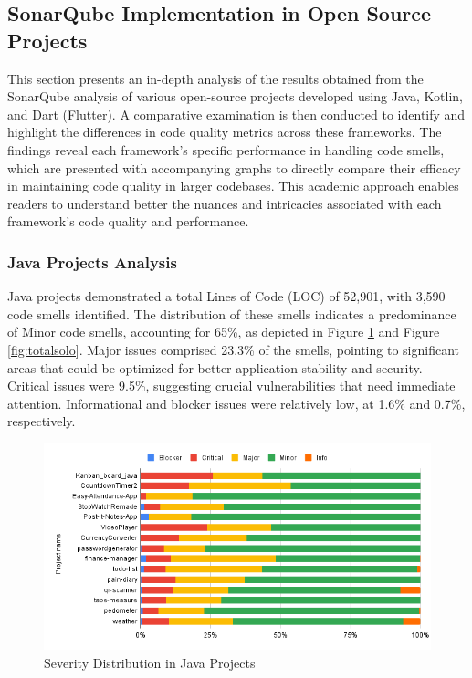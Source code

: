 \subsection{SonarQube Implementation in Open Source Projects}
This section presents an in-depth analysis of the results obtained from the SonarQube analysis of various open-source projects developed using Java, Kotlin, and Dart (Flutter). A comparative examination is then conducted to identify and highlight the differences in code quality metrics across these frameworks. The findings reveal each framework's specific performance in handling code smells, which are presented with accompanying graphs to directly compare their efficacy in maintaining code quality in larger codebases. This academic approach enables readers to understand better the nuances and intricacies associated with each framework's code quality and performance.
\subsubsection{Java Projects Analysis}
Java projects demonstrated a total Lines of Code (LOC) of 52,901, with 3,590 code smells identified. The distribution of these smells indicates a predominance of Minor code smells, accounting for 65\%, as depicted in Figure \ref{fig:javasolo} and Figure \ref{fig:totalsolo}. Major issues comprised 23.3\% of the smells, pointing to significant areas that could be optimized for better application stability and security. Critical issues were 9.5\%, suggesting crucial vulnerabilities that need immediate attention. Informational and blocker issues were relatively low, at 1.6\% and 0.7\%, respectively.

\begin{figure}[htbp]
    \centering
    \includegraphics[scale = 0.58]{img/JAVASOLO.png}
    \caption{Severity Distribution in Java Projects}
    \label{fig:javasolo}
\end{figure}

